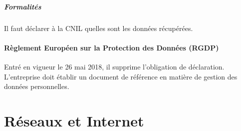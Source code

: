 \documentclass[10pt,a4paper,french]{article}
\begin{document}
\subsubsection{Formalités}

Il faut déclarer à la CNIL quelles sont les données récupérées.

\subsection{Règlement Européen sur la Protection des Données (RGDP)}\label{s:rgdp}

Entré en vigueur le 26 mai 2018, il supprime l'obligation de déclaration. L'entreprise doit établir un document de référence en matière de gestion des données personnelles.

\part{Réseaux et Internet}

\appendix %

\printindex
\end{document}
